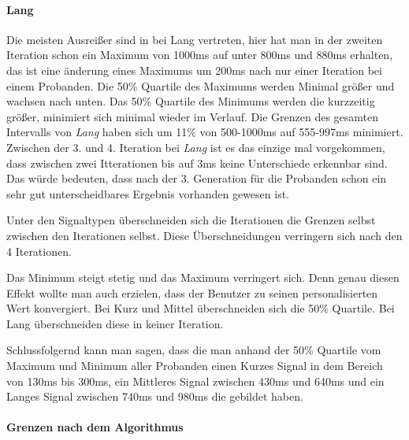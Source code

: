 \paragraph{Lang}
Die meisten Ausrei{\ss}er sind in bei Lang vertreten, hier hat man in der zweiten Iteration schon ein Maximum von 1000ms auf unter 800ms und 880ms erhalten, das ist eine {\"a}nderung eines Maximums um 200ms nach nur einer Iteration bei einem Probanden.
Die 50\% Quartile des Maximums werden Minimal gr{\"o}{\ss}er und wachsen nach unten.
Das 50\% Quartile des Minimums werden die kurzzeitig gr{\"o}{\ss}er, minimiert sich minimal wieder im Verlauf.
Die Grenzen des gesamten Intervalls von \textit{Lang} haben sich um 11\% von 500-1000ms auf 555-997ms minimiert.
Zwischen der 3. und 4. Iteration bei \textit{Lang} ist es das einzige mal vorgekommen, dass zwischen zwei Itterationen bis auf 3ms keine Unterschiede erkennbar sind.
Das würde bedeuten, dass nach der 3. Generation für die Probanden schon ein sehr gut unterscheidbares Ergebnis vorhanden gewesen ist.


Unter den Signaltypen {\"u}berschneiden sich die Iterationen die Grenzen selbst zwischen den Iterationen selbst. 
Diese {\"U}berschneidungen verringern sich nach den 4 Iterationen.

Das Minimum steigt stetig und das Maximum verringert sich. 
Denn genau diesen Effekt wollte man auch erzielen, dass der Benutzer zu seinen personalisierten Wert konvergiert.
Bei Kurz und Mittel {\"u}berschneiden sich die 50\% Quartile. 
Bei Lang {\"u}berschneiden diese in keiner Iteration.

Schlussfolgernd kann man sagen, dass die man anhand der 50\% Quartile vom Maximum und Minimum aller Probanden einen Kurzes Signal in dem Bereich von 130ms bis 300ms, ein Mittleres Signal zwischen 430ms und 640ms und ein Langes Signal zwischen 740ms und 980ms die gebildet haben. 




\paragraph{Grenzen nach dem Algorithmus}

